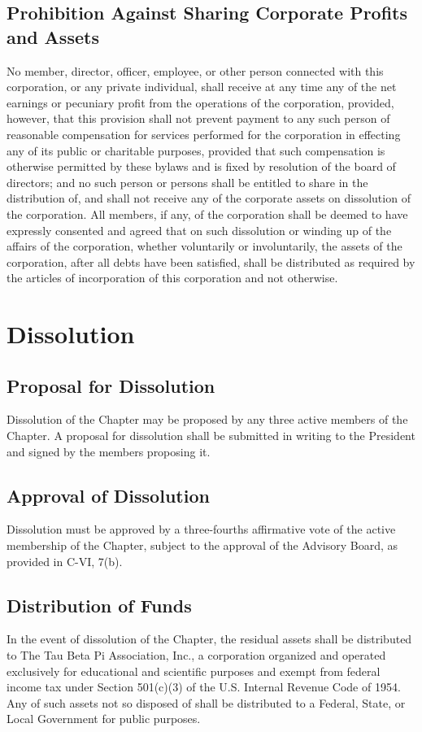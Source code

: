 \documentclass{article}
\begin{document}
	\subsection{Prohibition Against Sharing Corporate Profits and Assets}
	No member, director, officer, employee, or other person connected with this corporation, or any private individual, shall receive at any time any of the net earnings or pecuniary profit from the operations of the corporation, provided, however, that this provision shall not prevent payment to any such person of reasonable compensation for services performed for the corporation in effecting any of its public or charitable purposes, provided that such compensation is otherwise permitted by these bylaws and is fixed by resolution of the board of directors; and no such person or persons shall be entitled to share in the distribution of, and shall not receive any of the corporate assets on dissolution of the corporation. All members, if any, of the corporation shall be deemed to have expressly consented and agreed that on such dissolution or winding up of the affairs of the corporation, whether voluntarily or involuntarily, the assets of the corporation, after all debts have been satisfied, shall be distributed as required by the articles of incorporation of this corporation and not otherwise.
	
	\section{Dissolution}
	\subsection{Proposal for Dissolution}
	Dissolution of the Chapter may be proposed by any three active members of the Chapter. A proposal for dissolution shall be submitted in writing to the President and signed by the members proposing it.
	\subsection{Approval of Dissolution}
	Dissolution must be approved by a three-fourths affirmative vote of the active membership of the Chapter, subject to the approval of the Advisory Board, as provided in C-VI, 7(b).
	\subsection{Distribution of Funds}
	In the event of dissolution of the Chapter, the residual assets shall be distributed to The Tau Beta Pi Association, Inc., a corporation organized and operated exclusively for educational and scientific purposes and exempt from federal income tax under Section 501(c)(3) of the U.S. Internal Revenue Code of 1954. Any of such assets not so disposed of shall be distributed to a Federal, State, or Local Government for public purposes.
\end{document}
